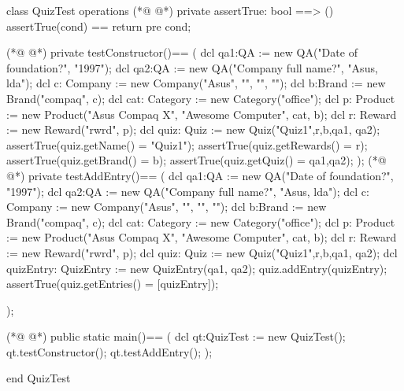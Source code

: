 \begin{vdmpp}[breaklines=true]
class QuizTest
 operations
(*@
\label{assertTrue:3}
@*)
  private assertTrue: bool ==> ()
    assertTrue(cond) == return
    pre cond;
    
(*@
\label{testConstructor:7}
@*)
  private testConstructor()==
  (
   dcl qa1:QA := new QA("Date of foundation?", "1997");
   dcl qa2:QA := new QA("Company full name?", "Asus, lda");
   dcl c: Company := new Company("Asus", "", "", "");
   dcl b:Brand := new Brand("compaq", c);
   dcl cat: Category := new Category("office");
   dcl p: Product := new Product("Asus Compaq X", "Awesome Computer", cat, b);
   dcl r: Reward := new Reward("rwrd", p);
   dcl quiz: Quiz := new Quiz("Quiz1",{r},b,{qa1, qa2});
   assertTrue(quiz.getName() = "Quiz1");
   assertTrue(quiz.getRewards() = {r});
   assertTrue(quiz.getBrand() = b);
   assertTrue(quiz.getQuiz() = {qa1,qa2});
  );
(*@
\label{testAddEntry:22}
@*)
  private testAddEntry()==
   (
   dcl qa1:QA := new QA("Date of foundation?", "1997");
   dcl qa2:QA := new QA("Company full name?", "Asus, lda");
   dcl c: Company := new Company("Asus", "", "", "");
   dcl b:Brand := new Brand("compaq", c);
   dcl cat: Category := new Category("office");
   dcl p: Product := new Product("Asus Compaq X", "Awesome Computer", cat, b);
   dcl r: Reward := new Reward("rwrd", p);
   dcl quiz: Quiz := new Quiz("Quiz1",{r},b,{qa1, qa2});
   dcl quizEntry: QuizEntry := new QuizEntry({qa1, qa2});
   quiz.addEntry(quizEntry);
   assertTrue(quiz.getEntries() = [quizEntry]);
      
  );
  
(*@
\label{main:38}
@*)
  public static main()==
    (
   dcl qt:QuizTest := new QuizTest();
   qt.testConstructor();
   qt.testAddEntry();
    );
     
end QuizTest
\end{vdmpp}
